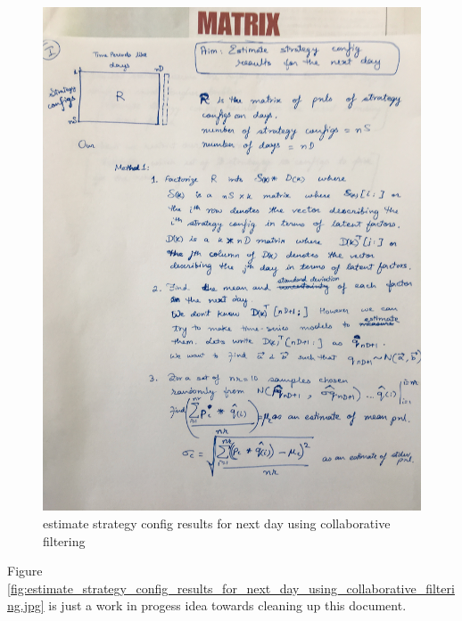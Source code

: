 \documentclass[a4paper]{article}
\begin{document}
\begin{centering}
	\begin{figure}
		
		\includegraphics[scale=0.05]{estimate_strategy_config_results_for_next_day_using_collaborative_filtering.jpg}

		
		
		\caption{estimate strategy config results for next day using collaborative filtering}
		\label{fig:estimate strategy config results for next day using collaborative filtering}
		
	\end{figure}
\end{centering}

Figure
\ref{fig:estimate_strategy_config_results_for_next_day_using_collaborative_filtering.jpg}
is just a work in progess idea towards cleaning up this document.
\end{document}

